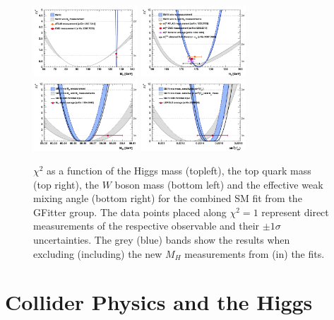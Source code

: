 \begin{figure}[!t]
\centering 
\includegraphics[width=0.35\textwidth]{figs/HiggsScan.pdf}
\includegraphics[width=0.35\textwidth]{figs/TopScan.pdf}
\includegraphics[width=0.35\textwidth]{figs/WMassScan.pdf}
\includegraphics[width=0.35\textwidth]{figs/Sin2ThetaScan.pdf}
\caption{
$\chi^2$ as a function of the Higgs mass (topleft), the top quark mass (top
    right), the $W$ boson mass (bottom left) and the effective weak mixing
  angle (bottom right) for the combined SM fit from the GFitter group.  The
  data points placed along $\chi^2=1$ represent direct measurements of the
  respective observable and their $\pm 1\sigma$ uncertainties.  The grey (blue)
  bands show the results when excluding (including) the new $M_H$ measurements
  from (in) the fits. } \label{figure:theory_scans}
\end{figure}


\section{Collider Physics and the Higgs} 

